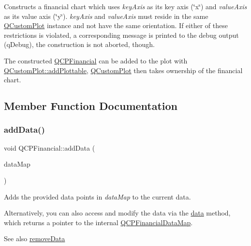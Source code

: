 Constructs a financial chart which uses {\itshape key\+Axis} as its key axis (\char`\"{}x\char`\"{}) and {\itshape value\+Axis} as its value axis (\char`\"{}y\char`\"{}). {\itshape key\+Axis} and {\itshape value\+Axis} must reside in the same \hyperlink{class_q_custom_plot}{Q\+Custom\+Plot} instance and not have the same orientation. If either of these restrictions is violated, a corresponding message is printed to the debug output (q\+Debug), the construction is not aborted, though.

The constructed \hyperlink{class_q_c_p_financial}{Q\+C\+P\+Financial} can be added to the plot with \hyperlink{class_q_custom_plot_ab7ad9174f701f9c6f64e378df77927a6}{Q\+Custom\+Plot\+::add\+Plottable}, \hyperlink{class_q_custom_plot}{Q\+Custom\+Plot} then takes ownership of the financial chart. 

\subsection{Member Function Documentation}
\hypertarget{class_q_c_p_financial_a1a83396f97fcc68f2b7aa8d9782feffe}{}\label{class_q_c_p_financial_a1a83396f97fcc68f2b7aa8d9782feffe} 
\subsubsection{\texorpdfstring{add\+Data()}{addData()}\hspace{0.1cm}{\footnotesize\ttfamily [1/4]}}
{\footnotesize\ttfamily void Q\+C\+P\+Financial\+::add\+Data (\begin{DoxyParamCaption}\item[{const \hyperlink{qcustomplot_8h_a745c09823fae0974b50beca9bc3b3d7d}{Q\+C\+P\+Financial\+Data\+Map} \&}]{data\+Map }\end{DoxyParamCaption})}

Adds the provided data points in {\itshape data\+Map} to the current data.

Alternatively, you can also access and modify the data via the \hyperlink{class_q_c_p_financial_a528c81578e4f25999a9169127763cfd4}{data} method, which returns a pointer to the internal \hyperlink{qcustomplot_8h_a745c09823fae0974b50beca9bc3b3d7d}{Q\+C\+P\+Financial\+Data\+Map}.

\begin{DoxySeeAlso}{See also}
\hyperlink{class_q_c_p_financial_a048c741d3c8cc5709c2c44b759fdf27c}{remove\+Data} 
\end{DoxySeeAlso}
\hypertarget{class_q_c_p_financial_a3b6144b48a6a8e63236fc5bf70d40c00}{}\label{class_q_c_p_financial_a3b6144b48a6a8e63236fc5bf70d40c00} 
